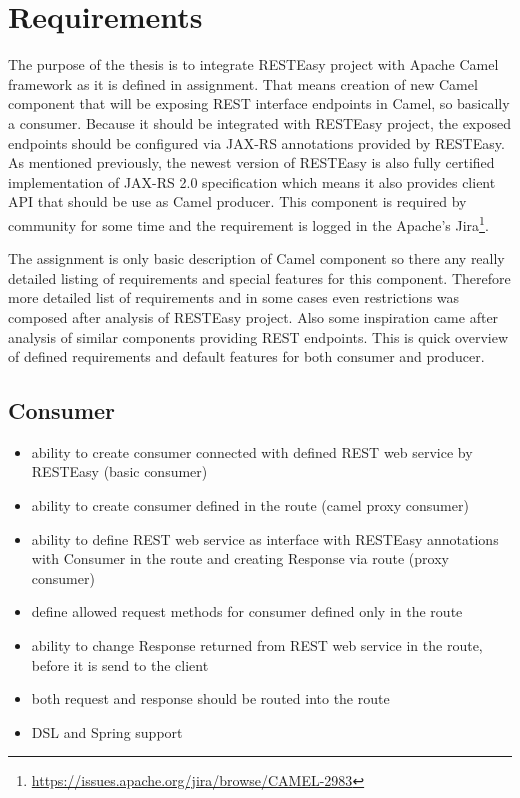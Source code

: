 \documentclass[12pt,final,oneside]{fithesis2}
\begin{document}
\section{Requirements}
The purpose of the thesis is to integrate RESTEasy project with Apache Camel framework as it is defined in assignment. That means creation of new Camel component that will be exposing REST interface endpoints in Camel, so basically a consumer. Because it should be integrated with RESTEasy project, the exposed endpoints should be configured via JAX-RS annotations provided by RESTEasy. As mentioned previously, the newest version of RESTEasy is also fully certified implementation of JAX-RS 2.0 specification which means it also provides client API that should be use as Camel producer. This component is required by community for some time and the requirement is logged in  
the Apache's Jira\footnote{\url{https://issues.apache.org/jira/browse/CAMEL-2983}}.

The assignment is only basic description of Camel component so there any really detailed listing of requirements and special features for this component. Therefore more detailed list of requirements and in some cases even restrictions was composed after analysis of RESTEasy project. Also some inspiration came after analysis of similar components providing REST endpoints. This is quick overview of defined requirements and default features for both consumer and producer.

\subsection{Consumer}
\begin{itemize}
\item
ability to create consumer connected with defined REST web service by RESTEasy (basic consumer)

\item
ability to create consumer defined in the route (camel proxy consumer)

\item
ability to define REST web service as interface with RESTEasy annotations with Consumer in the route and creating Response via route (proxy consumer)

\item
define allowed request methods for consumer defined only in the route


\item
ability to change Response returned from REST web service in the route, before it is send to the client 

\item
both request and response should be routed into the route

\item
DSL and Spring support


\end{itemize}
\end{document}
